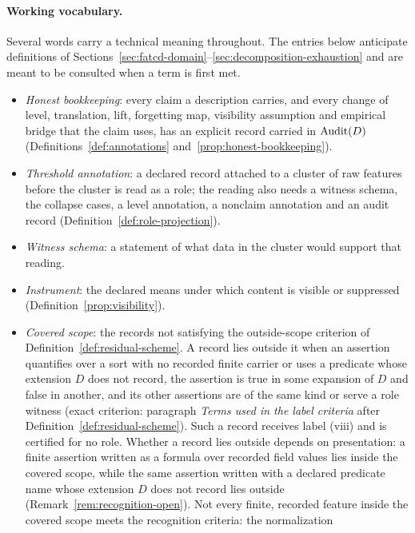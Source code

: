 \paragraph{Working vocabulary.} Several words carry a technical meaning
throughout. The entries below anticipate definitions of Sections~\ref{sec:fatcd-domain}--\ref{sec:decomposition-exhaustion} and are meant to be consulted when a term is first met.
\begin{itemize}[topsep=2pt,itemsep=1pt]
  \item \emph{Honest bookkeeping}: every claim a description carries, and
    every change of level, translation, lift, forgetting map, visibility
    assumption and empirical bridge that the claim uses, has an explicit
    record carried in \(\operatorname{Audit}\!\left(D\right)\) (Definitions~\ref{def:annotations} and~\ref{prop:honest-bookkeeping}).
  \item \emph{Threshold annotation}: a declared record attached to a
    cluster of raw features before the cluster is read as a role; the
    reading also needs a witness schema, the collapse cases, a level
    annotation, a nonclaim annotation and an audit record
    (Definition~\ref{def:role-projection}).
  \item \emph{Witness schema}: a statement of what data in the cluster
    would support that reading.
  \item \emph{Instrument}: the declared means under which content is
    visible or suppressed (Definition~\ref{prop:visibility}).
  \item \emph{Covered scope}: the records not satisfying the outside-scope
    criterion of Definition~\ref{def:residual-scheme}. A record lies outside it when an assertion quantifies over a
    sort with no recorded finite carrier or uses a predicate whose extension
    \(D\) does not record, the assertion is true in some expansion of
    \(D\) and false in another, and its other assertions are of the same kind or
    serve a role witness (exact criterion: paragraph \emph{Terms used in the
    label criteria} after Definition~\ref{def:residual-scheme}). Such a
    record receives label (viii) and is certified for no role. Whether a
    record lies outside depends on presentation: a finite assertion written
    as a formula over recorded field values lies inside the covered scope,
    while the same assertion written with a declared predicate name whose
    extension \(D\) does not record lies outside
    (Remark~\ref{rem:recognition-open}). Not every finite, recorded feature
    inside the covered scope meets the recognition criteria: the normalization

\end{itemize}

